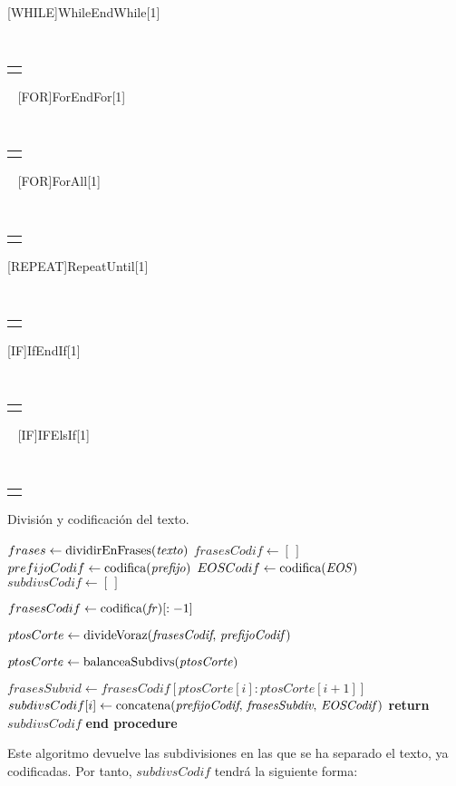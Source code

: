 \newcommand\CONDITION[2]%
{\begin{tabular}[t]{@{}l@{}}
		#1 #2
 \end{tabular}%
}
[WHILE]{While}{EndWhile}[1]%
{\algorithmicwhile\ \CONDITION{#1}{\ \algorithmicdo}}%
{\algorithmicend\ \algorithmicwhile}
[FOR]{For}{EndFor}[1]%
{\algorithmicfor\ \CONDITION{#1}{\ \algorithmicdo}}%
{\algorithmicend\ \algorithmicfor}
[FOR]{ForAll}[1]%
{\algorithmicforall\ \CONDITION{#1}{\ \algorithmicdo}}
[REPEAT]{Repeat}{Until}{\algorithmicrepeat}[1]%
{\algorithmicuntil\ \CONDITION{#1}{}}
[IF]{If}{EndIf}[1]%
{\algorithmicif\ \CONDITION{#1}{\ \algorithmicthen}}%
{\algorithmicend\ \algorithmicif}%
[IF]{IF}{ElsIf}[1]%
{\algorithmicelse\ \algorithmicif\ \CONDITION{#1}{\ \algorithmicthen}}
\begin{algorithm}
	\caption{División y codificación del texto.}\label{alg:division-codificacion}
	\begin{algorithmic}[1]
		\State $frases \gets \text{dividirEnFrases(\textit{texto})}$
		\State $frasesCodif \gets [\,]$ 
		\State $prefijoCodif \gets \text{codifica(\textit{prefijo})}$
		\State $EOSCodif \gets \text{codifica(\textit{EOS})}$ 
		\State $subdivsCodif \gets [\,]$ 
		
			\State $frasesCodif \gets \text{codifica(\textit{fr})}[:-1]$ 
		\EndFor
		
		\State $ptosCorte \gets \text{divideVoraz(\textit{frasesCodif}, \textit{prefijoCodif})}$
		
		\State $ptosCorte \gets \text{balanceaSubdivs(\textit{ptosCorte})}$

			\State $frasesSubvid \gets frasesCodif[ptosCorte[i]:ptosCorte[i+1]]$ 
			\State $subdivsCodif[i] \gets \text{concatena(\textit{prefijoCodif}, \textit{frasesSubdiv}, \textit{EOSCodif})}$
		\EndFor
		\State \textbf{return} $subdivsCodif$
		\State \hspace{-0.5cm}\textbf{end procedure}
		\EndProcedure
	\end{algorithmic}
\end{algorithm}

Este algoritmo devuelve las subdivisiones en las que se ha separado el texto, ya codificadas. Por tanto, $subdivsCodif$ tendrá la siguiente forma:

